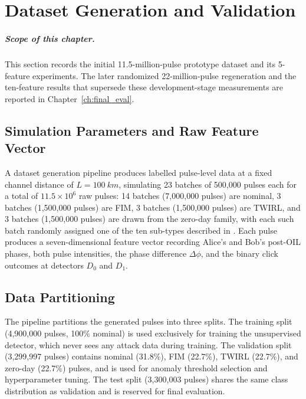 \documentclass[12pt, a4paper]{report}
\begin{document}
\chapter{Dataset Generation and Validation}\label{ch:dataset}
\paragraph{Scope of this chapter.} This section records the initial 11.5-million-pulse prototype dataset and its 5-feature experiments. The later randomized 22-million-pulse regeneration and the ten-feature results that supersede these development-stage measurements are reported in Chapter~\ref{ch:final_eval}.


\section{Simulation Parameters and Raw Feature Vector}
A dataset generation pipeline produces labelled pulse-level data at a fixed channel distance of $L = \SI{100}{km}$, simulating 23 batches of 500{,}000 pulses each for a total of $11.5 \times 10^6$ raw pulses: 14 batches (7{,}000{,}000 pulses) are nominal, 3 batches (1{,}500{,}000 pulses) are FIM, 3 batches (1{,}500{,}000 pulses) are TWIRL, and 3 batches (1{,}500{,}000 pulses) are drawn from the zero-day family, with each such batch randomly assigned one of the ten sub-types described in . Each pulse produces a seven-dimensional feature vector recording Alice's and Bob's post-OIL phases, both pulse intensities, the phase difference $\Delta\phi$, and the binary click outcomes at detectors $D_0$ and $D_1$.

\section{Data Partitioning}\label{sec:splits}
The pipeline partitions the generated pulses into three splits. The training split (4{,}900{,}000 pulses, 100\% nominal) is used exclusively for training the unsupervised detector, which never sees any attack data during training. The validation split (3{,}299{,}997 pulses) contains nominal (31.8\%), FIM (22.7\%), TWIRL (22.7\%), and zero-day (22.7\%) pulses, and is used for anomaly threshold selection and hyperparameter tuning. The test split (3{,}300{,}003 pulses) shares the same class distribution as validation and is reserved for final evaluation.
\end{document}
